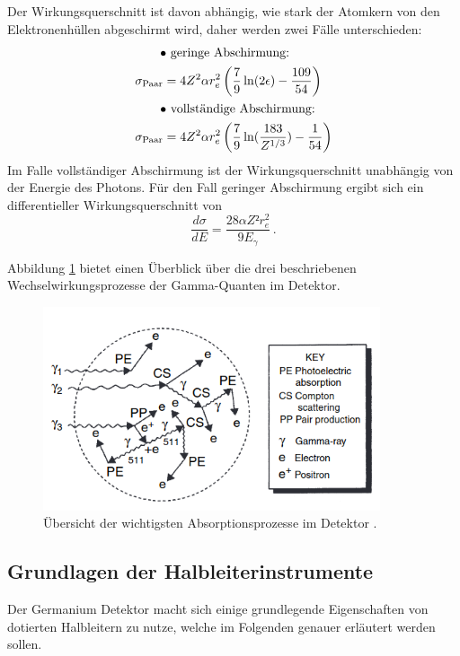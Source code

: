 Der Wirkungsquerschnitt ist davon abhängig, wie stark der Atomkern von den Elektronenhüllen abgeschirmt wird, daher werden zwei Fälle unterschieden:
\begin{align}
\intertext{$\qquad\bullet$ geringe Abschirmung: } \sigma_{\text{Paar}}&=4Z^2 \alpha r_e^2 \left(\frac{7}{9}\ln(2\epsilon)-\frac{109}{54}\right)\\
\intertext{$\qquad\bullet$ vollständige Abschirmung: } \sigma_{\text{Paar}}&=4Z^2 \alpha r_e^2 \left(\frac{7}{9}\ln(\frac{183}{Z^{1/3}})-\frac{1}{54}\right)
\end{align}
Im Falle vollständiger Abschirmung ist der Wirkungsquerschnitt unabhängig von der Energie des Photons.
Für den Fall geringer Abschirmung ergibt sich ein differentieller Wirkungsquerschnitt von
\begin{equation}
\frac{d\sigma}{d E} = \frac{28\alpha Z² r_e^2}{9E_{\gamma}}\, .
\end{equation}

Abbildung \ref{fig:tfig5} bietet einen Überblick über die drei beschriebenen Wechselwirkungsprozesse der Gamma-Quanten im Detektor.

\FloatBarrier
\begin{figure}
\centering
\includegraphics[height=6cm]{alles.png}
\caption{Übersicht der wichtigsten Absorptionsprozesse im Detektor \cite{quelle02}.}
\label{fig:tfig5}
\end{figure}
\FloatBarrier

\subsection{Grundlagen der Halbleiterinstrumente}
Der Germanium Detektor macht sich einige grundlegende Eigenschaften von dotierten Halbleitern zu nutze, welche im Folgenden genauer erläutert werden sollen.

